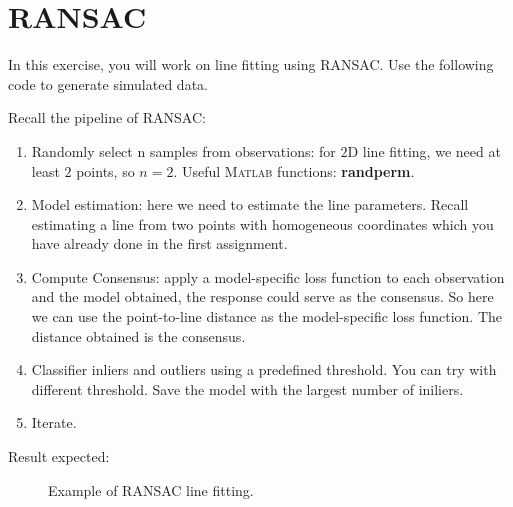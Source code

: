\documentclass[a4paper]{article}
\begin{document}
\section{RANSAC}
In this exercise, you will work on line fitting using RANSAC. Use the following code to generate simulated data.

Recall the pipeline of RANSAC:
\begin{enumerate}
\item Randomly select n samples from observations: for $2$D line fitting, we need at least $2$ points, so $n=2$. Useful \textsc{Matlab} functions: \textbf{randperm}. 
\item Model estimation: here we need to estimate the line parameters. Recall estimating a line from two points with homogeneous coordinates which you have already done in the first assignment.
\item Compute Consensus: apply a model-specific loss function to each observation and the model obtained, the response could serve as the consensus. So here we can use the point-to-line distance as the  model-specific loss function. The distance obtained is the consensus.
\item Classifier inliers and outliers using a predefined threshold. You can try with different threshold. Save the model with the largest number of iniliers.
\item Iterate.
\end{enumerate}
Result expected:
\begin{figure}[thpb]
	\setlength{\fboxrule}{0.0pt}      
	\caption{Example of RANSAC line fitting.}
\end{figure}

 

\end{document}
